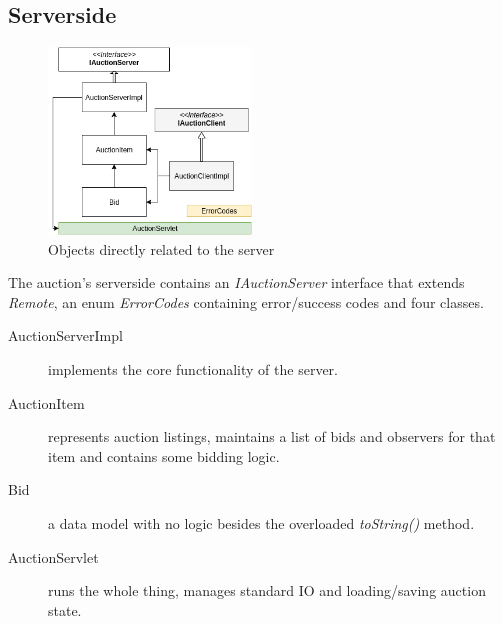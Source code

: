 \documentclass[10pt]{article}
\begin{document}
\subsection{Serverside}
\begin{figure}
  \begin{flushright}
    \includegraphics[width=0.48\textwidth]{srv.png}
  \end{flushright}
  \caption{Objects directly related to the server}
\end{figure}
The auction's serverside contains an \textit{IAuctionServer} interface that extends \textit{Remote}, an enum \textit{ErrorCodes} containing error/success codes and four classes.
\begin{description}
\item [AuctionServerImpl] implements the core functionality of the server.
\item [AuctionItem] represents auction listings, maintains a list of bids and observers for that item and contains some bidding logic.
\item [Bid] a data model with no logic besides the overloaded \textit{toString()} method.
\item [AuctionServlet] runs the whole thing, manages standard IO and loading/saving auction state.
\end{description}
\pagebreak
\end{document}
